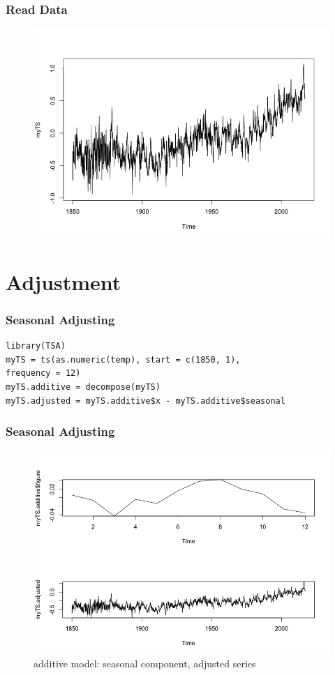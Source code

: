 \documentclass[9pt]{beamer}
\begin{document}
\begin{frame}
\frametitle{Read Data}
\begin{figure}[H]
\centering
\includegraphics[scale=.45]{temp.png}
\end{figure}
\end{frame}

\section{Adjustment}

\begin{frame}[fragile]
\frametitle{Seasonal Adjusting}
\begin{verbatim}
library(TSA)
myTS = ts(as.numeric(temp), start = c(1850, 1), 
frequency = 12)
myTS.additive = decompose(myTS)
myTS.adjusted = myTS.additive$x - myTS.additive$seasonal
\end{verbatim}
\end{frame}

\begin{frame}[fragile]
\frametitle{Seasonal Adjusting}

\begin{figure}[H]
\centering
\caption{additive model: seasonal component, adjusted series}
\includegraphics[scale=.30]{component.png}
\end{figure}
\end{frame}
\end{document}
